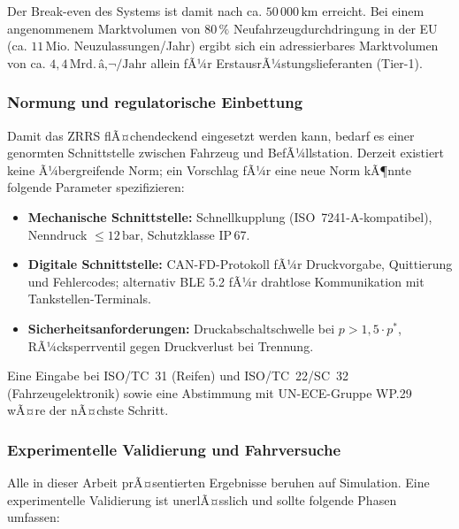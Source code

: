 ﻿\documentclass[a4paper,12pt]{article}
\theoremstyle{definition}
\begin{document}
Der Break-even des Systems ist damit nach ca. $50\,000\,\text{km}$ erreicht.
Bei einem angenommenem Marktvolumen von $80\,\%$ Neufahrzeugdurchdringung in
der EU (ca. $11\,\text{Mio.}$ Neuzulassungen/Jahr) ergibt sich ein
adressierbares Marktvolumen von ca. $4{,}4\,\text{Mrd.}\,\text{â‚¬/Jahr}$
allein fÃ¼r ErstausrÃ¼stungslieferanten (Tier-1).

\subsubsection{Normung und regulatorische Einbettung}

Damit das ZRRS flÃ¤chendeckend eingesetzt werden kann, bedarf es einer
genormten Schnittstelle zwischen Fahrzeug und BefÃ¼llstation. Derzeit existiert
keine Ã¼bergreifende Norm; ein Vorschlag fÃ¼r eine neue Norm kÃ¶nnte folgende
Parameter spezifizieren:

\begin{itemize}
    \item \textbf{Mechanische Schnittstelle:} Schnellkupplung (ISO~7241-A-kompatibel),
    Nenndruck $\leq 12\,\text{bar}$, Schutzklasse IP\,67.
    \item \textbf{Digitale Schnittstelle:} CAN-FD-Protokoll fÃ¼r Druckvorgabe,
    Quittierung und Fehlercodes; alternativ BLE 5.2 fÃ¼r drahtlose Kommunikation
    mit Tankstellen-Terminals.
    \item \textbf{Sicherheitsanforderungen:} Druckabschaltschwelle bei
    $p > 1{,}5 \cdot p^*$, RÃ¼cksperrventil gegen Druckverlust bei Trennung.
\end{itemize}

Eine Eingabe bei ISO/TC~31 (Reifen) und ISO/TC~22/SC~32 (Fahrzeugelektronik)
sowie eine Abstimmung mit UN-ECE-Gruppe WP.29 wÃ¤re der nÃ¤chste Schritt.

\subsubsection{Experimentelle Validierung und Fahrversuche}

Alle in dieser Arbeit prÃ¤sentierten Ergebnisse beruhen auf Simulation.
Eine experimentelle Validierung ist unerlÃ¤sslich und sollte folgende
Phasen umfassen:
\end{document}
